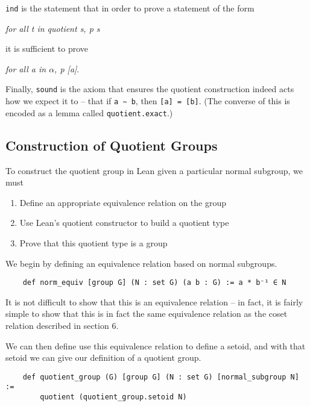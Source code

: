 \documentclass[runningheads,a4paper]{llncs}
\renewcommand{\a}{\alpha}
\renewcommand{\-}{\setminus}
\begin{document}
\lstinline{ind} is the statement that in order to prove a statement of the form

\vspace{2 mm}
\hspace{2 em}\textit{for all t in quotient s, p s}
\vspace{2 mm}

it is sufficient to prove

\vspace{2 mm}
\hspace{2 em}\textit{for all a in $\a$, p [a]}.
\vspace{2 mm}

Finally, \lstinline{sound} is the axiom that ensures the quotient construction indeed acts how we expect it to -- that if \lstinline{a ∼ b}, then \lstinline{[a] = [b]}. (The converse of this is encoded as a lemma called \lstinline{quotient.exact}.)

\subsection{Construction of Quotient Groups}

To construct the quotient group in Lean given a particular normal subgroup, we must
\begin{enumerate}
    \item Define an appropriate equivalence relation on the group
    \item Use Lean's quotient constructor to build a quotient type
    \item Prove that this quotient type is a group
\end{enumerate}

We begin by defining an equivalence relation based on normal subgroups.

\begin{lstlisting}
    def norm_equiv [group G] (N : set G) (a b : G) := a * b⁻¹ ∈ N
\end{lstlisting}

It is not difficult to show that this is an equivalence relation -- in fact, it is fairly simple to show that this is in fact the same equivalence relation as the coset relation described in section 6.

We can then define use this equivalence relation to define a setoid, and with that setoid we can give our definition of a quotient group.

\begin{lstlisting}
    def quotient_group (G) [group G] (N : set G) [normal_subgroup N] := 
        quotient (quotient_group.setoid N)
\end{lstlisting}
\end{document}
